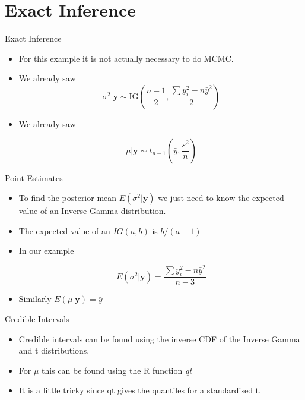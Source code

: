 \documentclass[10pt]{beamer}
\begin{document}
\section{Exact Inference}
\begin{frame}{Exact Inference}
  \begin{itemize}
  \item For this example it is not actually necessary to do MCMC.

  \item We already saw
    \begin{equation}
      \sigma^2|{\bm y}\sim \mbox{IG}\left(\frac{n-1}{2},\frac{\sum y_i^2-n\bar{y}^2}{2}\right)
    \end{equation}

  \item We already saw

    \begin{equation}
      \mu|{\bm y}\sim t_{n-1}\left(\bar{y},\frac{s^2}{n}\right)
    \end{equation}
  \end{itemize}
\end{frame}
\begin{frame}{Point Estimates}
  \begin{itemize}
  \item To find the posterior mean $E(\sigma^2|{\bm y})$ we just need to know the expected value of an Inverse Gamma distribution.

  \item The expected value of an $IG(a,b)$ is $b/(a-1)$

  \item In our example

    \begin{equation}
      E(\sigma^2|{\bm y})=\frac{\sum y_i^2-n\bar{y}^2}{n-3}
    \end{equation}

  \item Similarly $E(\mu|{\bm y})=\bar{y}$

  \end{itemize}
\end{frame}
\begin{frame}{Credible Intervals}
  \begin{itemize}
  \item Credible intervals can be found using the inverse CDF of the Inverse Gamma and t distributions.

  \item For $\mu$ this can be found using the R function {\em qt}

  \item It is a little tricky since qt gives the quantiles for a standardised t.
  \end{itemize}
\end{frame}
\end{document}
